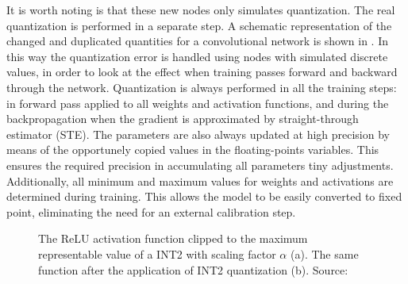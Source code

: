 It is worth noting is that these new nodes only simulates quantization. The real quantization is performed in a separate step. A schematic representation of the changed and duplicated quantities for a convolutional network is shown in \Figure{\ref{fig:qnn_neuron}}.
In this way the quantization error is handled using nodes with simulated discrete values, in order to look at the effect when training passes forward and backward through the network. Quantization is always performed in all the training steps: in forward pass applied to all weights and activation functions, and during the backpropagation when the gradient is approximated by straight-through estimator (STE). The parameters are also always updated at high precision by means of the opportunely copied values in the floating-points variables. This ensures the required precision in accumulating all parameters tiny adjustments.
Additionally, all minimum and maximum values for weights and activations are determined during training. This allows the model to be easily converted to fixed point, eliminating the need for an external calibration step.

\begin{figure}
    \centering
    \caption{ The ReLU activation function clipped to the maximum representable value of a INT2 with scaling factor $\alpha$ (a). The same function after the application of INT2 quantization (b).
    Source:~\cite{yin2019understanding} }
    \label{fig:qrelu}
\end{figure}



